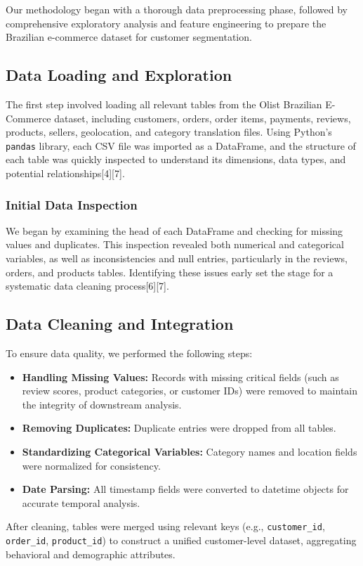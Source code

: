 \documentclass[a4paper]{article}
\begin{document}
\begin{multicols}{2}
Our methodology began with a thorough data preprocessing phase, followed by comprehensive exploratory analysis and feature engineering to prepare the Brazilian e-commerce dataset for customer segmentation.

\subsection{Data Loading and Exploration}

The first step involved loading all relevant tables from the Olist Brazilian E-Commerce dataset, including customers, orders, order items, payments, reviews, products, sellers, geolocation, and category translation files. Using Python’s \texttt{pandas} library, each CSV file was imported as a DataFrame, and the structure of each table was quickly inspected to understand its dimensions, data types, and potential relationships[4][7].

\subsubsection{Initial Data Inspection}

We began by examining the head of each DataFrame and checking for missing values and duplicates. This inspection revealed both numerical and categorical variables, as well as inconsistencies and null entries, particularly in the reviews, orders, and products tables. Identifying these issues early set the stage for a systematic data cleaning process[6][7].

\subsection{Data Cleaning and Integration}

To ensure data quality, we performed the following steps:
\begin{itemize}
    \item \textbf{Handling Missing Values:} Records with missing critical fields (such as review scores, product categories, or customer IDs) were removed to maintain the integrity of downstream analysis.
    \item \textbf{Removing Duplicates:} Duplicate entries were dropped from all tables.
    \item \textbf{Standardizing Categorical Variables:} Category names and location fields were normalized for consistency.
    \item \textbf{Date Parsing:} All timestamp fields were converted to datetime objects for accurate temporal analysis.
\end{itemize}
After cleaning, tables were merged using relevant keys (e.g., \texttt{customer\_id}, \texttt{order\_id}, \texttt{product\_id}) to construct a unified customer-level dataset, aggregating behavioral and demographic attributes.


\end{multicols}
\end{document}
